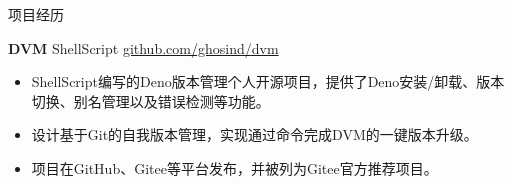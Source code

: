 \documentclass{resume} %
\begin{document}
\begin{rSection}{项目经历}
  \item \textbf{DVM} {ShellScript} \hfill \href{github.com/ghosind/dvm}{github.com/ghosind/dvm}
  \begin{itemize}
    \itemsep -3pt {}
    \item ShellScript编写的Deno版本管理个人开源项目，提供了Deno安装/卸载、版本切换、别名管理以及错误检测等功能。
    \item 设计基于Git的自我版本管理，实现通过命令完成DVM的一键版本升级。
    \item 项目在GitHub、Gitee等平台发布，并被列为Gitee官方推荐项目。
  \end{itemize}
  
\end{rSection}
\end{document}
